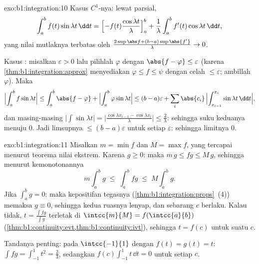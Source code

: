 \begin{solution}{exo:b1:integration:10}
Kasus $C^1$-nya: lewat parsial,
\[
\int_a^b f(t)\sin\lambda t\,\dd t
= \Bigl[-f(t)\frac{\cos\lambda t}{\lambda}\Bigr]_a^b
+ \frac{1}{\lambda}\int_a^b f'(t)\cos\lambda t\,\dd t,
\]
yang nilai mutlaknya terbatas oleh $\frac{2\sup\abs f + (b - a)\sup\abs{f'}}
{\lambda} \to 0$.

Kasus : misalkan $\varepsilon > 0$ lalu pilihlah 
$\varphi$ dengan $\abs{f - \varphi} \leq \varepsilon$
(karena \cref{thm:b1:integration:approx} menyediakan $\varphi \leq f \leq
\psi$ dengan celah $\leq\varepsilon$; ambillah $\varphi$). Maka
\[
\Bigl|\int_a^b f\sin\lambda t\Bigr|
\leq \int_a^b \abs{f - \varphi}
+ \Bigl|\int_a^b \varphi \sin\lambda t\Bigr|
\leq (b-a)\varepsilon
+ \sum_i \abs{c_i}\,\Bigl|\int_{x_{i-1}}^{x_i} \sin\lambda t\,\dd
t\Bigr| ,
\]
dan masing-masing $\bigl|\int \sin \lambda t\bigr| = \bigl|\frac{\cos\lambda
x_{i-1} - \cos\lambda x_i}{\lambda}\bigr| \leq \frac{2}{\lambda}$:
sehingga suku keduanya menuju $0$. Jadi limsupnya $\leq
(b-a)\varepsilon$ untuk setiap $\varepsilon$: sehingga limitnya $0$.
\end{solution}

\begin{solution}{exo:b1:integration:11}
Misalkan $m = \min f$ dan $M = \max f$, yang tercapai menurut teorema nilai
ekstrem. Karena $g \geq 0$: maka $m\,g \leq fg \leq M\,g$, sehingga menurut
kemonotonannya
\[
m \int_a^b g \;\leq\; \int_a^b fg \;\leq\; M \int_a^b g .
\]
Jika $\int_a^b g = 0$: maka kepositifan tegasnya
(\cref{thm:b1:integration:props}~(4)) memaksa $g \equiv 0$, sehingga kedua
ruasnya lenyap, dan sebarang $c$ berlaku. Kalau tidak, $t = \frac{\int
fg}{\int g}$ terletak di $\intcc{m}{M} = f(\intcc{a}{b})$
(\cref{thm:b1:continuity:evt,thm:b1:continuity:ivt}), sehingga $t =
f(c)$ untuk suatu $c$.

Tandanya penting: pada $\intcc{-1}{1}$ dengan $f(t) = g(t) = t$: $\int
fg = \int_{-1}^1 t^2 = \frac23$, sedangkan $f(c)\int_{-1}^1 t\,\dd t
= 0$ untuk setiap $c$.
\end{solution}

